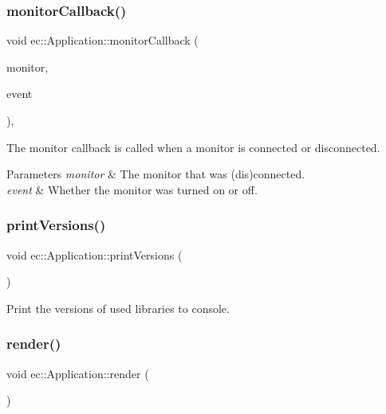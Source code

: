 \subsubsection{\texorpdfstring{monitor\+Callback()}{monitorCallback()}}
{\footnotesize\ttfamily void ec\+::\+Application\+::monitor\+Callback (\begin{DoxyParamCaption}\item[{G\+L\+F\+Wmonitor $\ast$}]{monitor,  }\item[{int}]{event }\end{DoxyParamCaption})\hspace{0.3cm}{\ttfamily [static]}, {\ttfamily [protected]}}



The monitor callback is called when a monitor is connected or disconnected. 


\begin{DoxyParams}{Parameters}
{\em monitor} & The monitor that was (dis)connected. \\
\hline
{\em event} & Whether the monitor was turned on or off. \\
\hline
\end{DoxyParams}
\mbox{\label{classec_1_1_application_a329a3b03c23e5aba31bbbb175930dbae}} 
\subsubsection{\texorpdfstring{print\+Versions()}{printVersions()}}
{\footnotesize\ttfamily void ec\+::\+Application\+::print\+Versions (\begin{DoxyParamCaption}{ }\end{DoxyParamCaption})\hspace{0.3cm}{\ttfamily [static]}}



Print the versions of used libraries to console. 

\mbox{\label{classec_1_1_application_a4fe5dcd06017ba4322eca3adec47e03e}} 
\subsubsection{\texorpdfstring{render()}{render()}}
{\footnotesize\ttfamily void ec\+::\+Application\+::render (\begin{DoxyParamCaption}{ }\end{DoxyParamCaption})\hspace{0.3cm}{\ttfamily [virtual]}}



